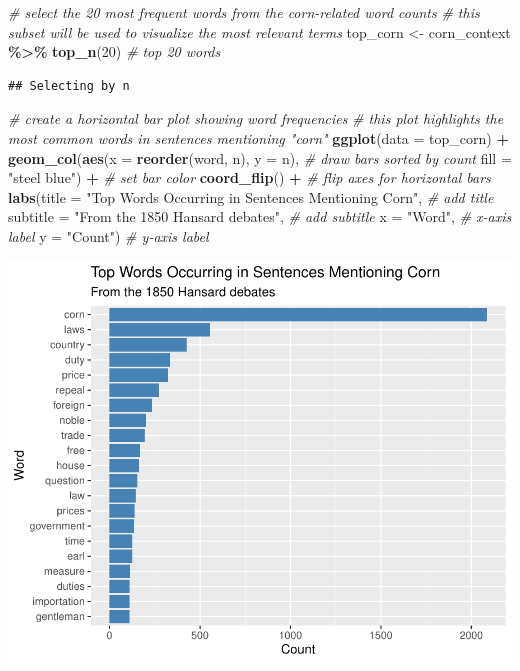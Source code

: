 \documentclass[
]{article}
\newenvironment{Shaded}{\begin{snugshade}}{\end{snugshade}}
\newcommand{\AttributeTok}[1]{\textcolor[rgb]{0.13,0.29,0.53}{#1}}
\newcommand{\CommentTok}[1]{\textcolor[rgb]{0.56,0.35,0.01}{\textit{#1}}}
\newcommand{\DecValTok}[1]{\textcolor[rgb]{0.00,0.00,0.81}{#1}}
\newcommand{\FunctionTok}[1]{\textcolor[rgb]{0.13,0.29,0.53}{\textbf{#1}}}
\newcommand{\NormalTok}[1]{#1}
\newcommand{\OtherTok}[1]{\textcolor[rgb]{0.56,0.35,0.01}{#1}}
\newcommand{\SpecialCharTok}[1]{\textcolor[rgb]{0.81,0.36,0.00}{\textbf{#1}}}
\newcommand{\StringTok}[1]{\textcolor[rgb]{0.31,0.60,0.02}{#1}}
\begin{document}
\begin{Shaded}
\begin{Highlighting}[]
\CommentTok{\# select the 20 most frequent words from the corn{-}related word counts}
\CommentTok{\# this subset will be used to visualize the most relevant terms}
\NormalTok{top\_corn }\OtherTok{\textless{}{-}}\NormalTok{ corn\_context }\SpecialCharTok{\%\textgreater{}\%}
  \FunctionTok{top\_n}\NormalTok{(}\DecValTok{20}\NormalTok{)  }\CommentTok{\# top 20 words}
\end{Highlighting}
\end{Shaded}

\begin{verbatim}
## Selecting by n
\end{verbatim}

\begin{Shaded}
\begin{Highlighting}[]
\CommentTok{\# create a horizontal bar plot showing word frequencies}
\CommentTok{\# this plot highlights the most common words in sentences mentioning "corn"}
\FunctionTok{ggplot}\NormalTok{(}\AttributeTok{data =}\NormalTok{ top\_corn) }\SpecialCharTok{+}
  \FunctionTok{geom\_col}\NormalTok{(}\FunctionTok{aes}\NormalTok{(}\AttributeTok{x =} \FunctionTok{reorder}\NormalTok{(word, n), }\AttributeTok{y =}\NormalTok{ n), }\CommentTok{\# draw bars sorted by count}
           \AttributeTok{fill =} \StringTok{"steel blue"}\NormalTok{) }\SpecialCharTok{+} \CommentTok{\# set bar color}
  \FunctionTok{coord\_flip}\NormalTok{() }\SpecialCharTok{+} \CommentTok{\# flip axes for horizontal bars}
  \FunctionTok{labs}\NormalTok{(}\AttributeTok{title =} \StringTok{"Top Words Occurring in Sentences Mentioning Corn"}\NormalTok{, }\CommentTok{\# add title}
       \AttributeTok{subtitle =} \StringTok{"From the 1850 Hansard debates"}\NormalTok{, }\CommentTok{\# add subtitle}
       \AttributeTok{x =} \StringTok{"Word"}\NormalTok{, }\CommentTok{\# x{-}axis label}
       \AttributeTok{y =} \StringTok{"Count"}\NormalTok{) }\CommentTok{\# y{-}axis label}
\end{Highlighting}
\end{Shaded}

\includegraphics[width=0.8\linewidth]{ch1-11.25.2024_files/figure-latex/unnamed-chunk-30-1}
\end{document}
